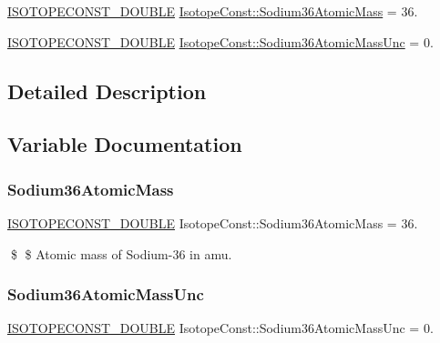 \begin{DoxyCompactItemize}
\item 
\mbox{\hyperlink{group___isotope_const-_macros_ga8f45a7272ce02c0b4c65c44636ed719a}{I\+S\+O\+T\+O\+P\+E\+C\+O\+N\+S\+T\+\_\+\+D\+O\+U\+B\+LE}} \mbox{\hyperlink{group___isotope_const-_sodium-_na36_ga234aea7b7c37308f515e01444d09bdc8}{Isotope\+Const\+::\+Sodium36\+Atomic\+Mass}} = 36.
\item 
\mbox{\hyperlink{group___isotope_const-_macros_ga8f45a7272ce02c0b4c65c44636ed719a}{I\+S\+O\+T\+O\+P\+E\+C\+O\+N\+S\+T\+\_\+\+D\+O\+U\+B\+LE}} \mbox{\hyperlink{group___isotope_const-_sodium-_na36_gae7aeaeedd229d9dce684766cb7f6bdf1}{Isotope\+Const\+::\+Sodium36\+Atomic\+Mass\+Unc}} = 0.
\end{DoxyCompactItemize}


\subsection{Detailed Description}


\subsection{Variable Documentation}
\mbox{\label{group___isotope_const-_sodium-_na36_ga234aea7b7c37308f515e01444d09bdc8}} 
\subsubsection{\texorpdfstring{Sodium36\+Atomic\+Mass}{Sodium36AtomicMass}}
{\footnotesize\ttfamily \mbox{\hyperlink{group___isotope_const-_macros_ga8f45a7272ce02c0b4c65c44636ed719a}{I\+S\+O\+T\+O\+P\+E\+C\+O\+N\+S\+T\+\_\+\+D\+O\+U\+B\+LE}} Isotope\+Const\+::\+Sodium36\+Atomic\+Mass = 36.}

\$ \$ Atomic mass of Sodium-\/36 in amu. \mbox{\label{group___isotope_const-_sodium-_na36_gae7aeaeedd229d9dce684766cb7f6bdf1}} 
\subsubsection{\texorpdfstring{Sodium36\+Atomic\+Mass\+Unc}{Sodium36AtomicMassUnc}}
{\footnotesize\ttfamily \mbox{\hyperlink{group___isotope_const-_macros_ga8f45a7272ce02c0b4c65c44636ed719a}{I\+S\+O\+T\+O\+P\+E\+C\+O\+N\+S\+T\+\_\+\+D\+O\+U\+B\+LE}} Isotope\+Const\+::\+Sodium36\+Atomic\+Mass\+Unc = 0.}


